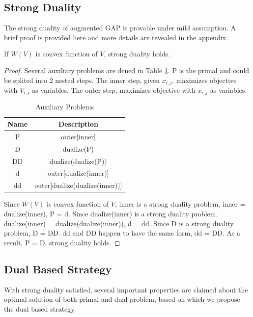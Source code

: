 \documentclass[sigconf]{acmart}
\newcommand{\sx}{x_{i,j}}
\newcommand{\sV}{V_{i,j}}
\begin{document}
\subsection{Strong Duality}

The strong duality of augmented GAP is provable under mild assumption.
A brief proof is provided here and more details are revealed in the appendix.

\begin{theorem}
If $W(V)$ is convex function of $V$, strong duality holds.
\end{theorem}

\begin{proof}
Several auxiliary problems are dened in Table \ref{TableAuxiliaryProblems}.
P is the primal and could be splited into 2 nested steps.
The inner step, given $\sx$, maximizes objective with $\sV$ as variables.
The outer step, maximizes objective with $\sx$ as variables.

\begin{table}
\caption{Auxiliary Problems\label{TableAuxiliaryProblems}}
\begin{center}
\begin{tabular}{|c|c|}
\hline
Name   & Description \\
\hline
P      & outer[inner] \\
\hline
D      & dualize(P) \\
\hline
DD     & dualize(dualize(P)) \\
\hline
d      & outer[dualize(inner)] \\
\hline
dd     & outer[dualize(dualize(inner))] \\
\hline
\end{tabular}
\end{center}
\end{table}

Since $W(V)$ is convex function of $V$, inner is a strong duality problem, inner = dualize(inner), P = d.
Since dualize(inner) is a strong duality problem, dualize(inner) = dualize(dualize(inner)), d = dd.
Since D is a strong duality problem, D = DD.
dd and DD happen to have the same form, dd = DD.
As a result, P = D, strong duality holds.
\end{proof}

\subsection{Dual Based Strategy}

With strong duality satisfied, several important properties are claimed about the optimal solution of both primal and dual problem,
    based on which we propose the dual based strategy.
\end{document}
